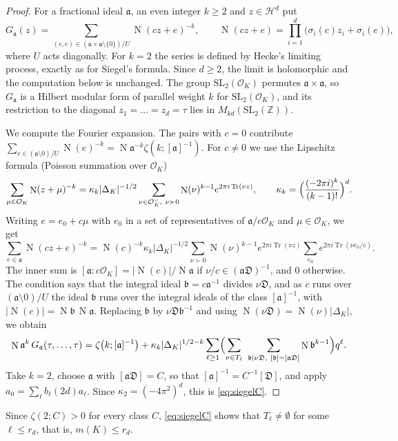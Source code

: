 \documentclass[11pt]{amsart}
\theoremstyle{definition}
\numberwithin{equation}{section}
\DeclareMathOperator{\Tr}{Tr}
\DeclareMathOperator{\N}{N}
\newcommand{\OK}{\mathcal{O}_K}
\newcommand{\OKd}{\mathcal{O}_K^{\vee}}
\newcommand{\Dif}{\mathfrak{D}}
\newcommand{\Z}{\mathbb{Z}}
\begin{document}
\begin{proof}
For a fractional ideal $\mathfrak a$, an even integer $k\ge2$ and $z\in\mathcal H^d$ put
\[
  G_{\mathfrak a}(z)=\sum_{(c,e)\in(\mathfrak a\times\mathfrak a\setminus\{0\})/U}\N(cz+e)^{-k},
  \qquad \N(cz+e)=\prod_{i=1}^d\bigl(\sigma_i(c)z_i+\sigma_i(e)\bigr),
\]
where $U$ acts diagonally.  For $k=2$ the series is defined by Hecke's limiting process, exactly as
for Siegel's formula.  Since $d\ge2$, the limit is holomorphic and the computation below is unchanged.
The group $\mathrm{SL}_2(\OK)$ permutes $\mathfrak a\times\mathfrak a$, so $G_{\mathfrak a}$ is a
Hilbert modular form of parallel weight $k$ for $\mathrm{SL}_2(\OK)$, and its restriction to the
diagonal $z_1=\dots=z_d=\tau$ lies in $M_{kd}(\mathrm{SL}_2(\Z))$.

We compute the Fourier expansion.  The pairs with $c=0$ contribute
$\sum_{e\in(\mathfrak a\setminus0)/U}\N(e)^{-k}=\N\mathfrak a^{-k}\zeta(k;[\mathfrak a]^{-1})$.
For $c\ne0$ we use the Lipschitz formula (Poisson summation over $\OK$)
\[
  \sum_{\mu\in\OK}\N(z+\mu)^{-k}=\kappa_k|\Delta_K|^{-1/2}\sum_{\nu\in\OKd,\ \nu\succ0}\N(\nu)^{k-1}e^{2\pi i\Tr(\nu z)},
  \qquad \kappa_k=\Bigl(\frac{(-2\pi i)^k}{(k-1)!}\Bigr)^{d}.
\]
Writing $e=e_0+c\mu$ with $e_0$ in a set of representatives of $\mathfrak a/c\OK$ and $\mu\in\OK$, we
get
\[
  \sum_{e\in\mathfrak a}\N(cz+e)^{-k}=\N(c)^{-k}\kappa_k|\Delta_K|^{-1/2}\sum_{\nu\succ0}\N(\nu)^{k-1}e^{2\pi i\Tr(\nu z)}
  \sum_{e_0}e^{2\pi i\Tr(\nu e_0/c)} .
\]
The inner sum is $[\mathfrak a:c\OK]=|\N(c)|/\N\mathfrak a$ if $\nu/c\in(\mathfrak a\Dif)^{-1}$, and $0$
otherwise.  The condition says that the integral ideal $\mathfrak b=c\mathfrak a^{-1}$ divides
$\nu\Dif$, and as $c$ runs over $(\mathfrak a\setminus0)/U$ the ideal $\mathfrak b$ runs over the
integral ideals of the class $[\mathfrak a]^{-1}$, with $|\N(c)|=\N\mathfrak b\,\N\mathfrak a$.
Replacing $\mathfrak b$ by $\nu\Dif\mathfrak b^{-1}$ and using $\N(\nu\Dif)=\N(\nu)|\Delta_K|$, we
obtain
\[
  \N\mathfrak a^{k}\,G_{\mathfrak a}(\tau,\dots,\tau)
  =\zeta\bigl(k;[\mathfrak a]^{-1}\bigr)+\kappa_k|\Delta_K|^{1/2-k}\sum_{\ell\ge1}
  \Bigl(\sum_{\nu\in T_\ell}\ \sum_{\mathfrak b\mid\nu\Dif,\ [\mathfrak b]=[\mathfrak a\Dif]}\N\mathfrak b^{k-1}\Bigr)q^\ell .
\]
Take $k=2$, choose $\mathfrak a$ with $[\mathfrak a\Dif]=C$, so that $[\mathfrak a]^{-1}=C^{-1}[\Dif]$,
and apply $a_0=\sum_\ell b_\ell(2d)a_\ell$.  Since $\kappa_2=(-4\pi^2)^d$, this is \eqref{eq:siegelC}.
\end{proof}

Since $\zeta(2;C)>0$ for every class $C$, \eqref{eq:siegelC} shows that $T_\ell\ne\emptyset$ for some
$\ell\le r_d$, that is, $m(K)\le r_d$.
\end{document}
